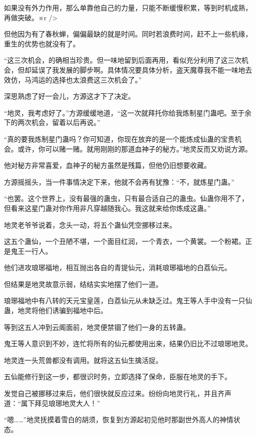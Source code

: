 
\begin{this_body}

如果没有外力作用，那么单靠他自己的力量，只能不断缓慢积累，等到时机成熟，再做突破。※r />

但他因为有了春秋蝉，偏偏最缺的就是时间。同时若浪费时间，赶不上一些机缘，重生的优势也就没有了。

“这三次机会，的确相当珍贵。但一味地留到后面再用，看似充分利用了这三次机会，但却延误了我发展的脚步啊。具体情况要具体分析，盗天魔尊我不能一味地去效仿，马鸿运的选择也太浪费这三次机会了。”

深思熟虑了好一会儿，方源这才下了决定。

“地灵，我考虑好了。”方源缓缓地道，“这一次就拜托你给我炼制星门蛊吧。至于余下的两次机会，留着以后再说。”

“真的要我炼制星门蛊吗？你可知道，你现在放弃的是一个能炼成仙蛊的宝贵机会。或许，你可以赌一赌。就用刚刚的那道血神子的秘方。”地灵反而又劝说方源。

他对秘方非常喜爱，血神子的秘方虽然是残篇，但他仍旧想要收藏。

方源摇摇头，当一件事情决定下来，他就不会再有犹豫：“不，就炼星门蛊。”

“也罢。这个世界上，没有最强的蛊虫，只有最合适自己的蛊虫。仙蛊你用不了，但看来这星门蛊对你作用非凡穿越随我心。我这就来给你炼成这蛊。”

地灵老爷爷说着，念头一动，将五个蛊仙凭空挪移过来。

这五个蛊仙，一个丑陋不堪，一个面目红润，一个青衣，一个黄裳。一个粉裙。正是鬼王一行人。

他们进攻琅琊福地，相互抛出各自的青提仙元，消耗琅琊福地的白荔仙元。

但结果是地灵故意示弱，结结实实地摆了他们一道。

琅琊福地中有八转的天元宝皇莲，白荔仙元从未缺乏过。鬼王等人手中没有一只仙蛊，地灵将他们诱骗到福地中后。

等到这五人冲到云阁面前，地灵便禁锢了他们一身的五转蛊。

鬼王等人意识到不妙，连忙将所有的仙元都使用出来，结果仍旧比不过琅琊地灵。

地灵连一头荒兽都没有调用。就将这五仙生擒活捉。

五仙能修行到这一步，都很识时务，立即选择了保命，臣服在地灵的手下。

发觉自己被挪移过来后，他们很快就反应过来。纷纷向地灵行礼，并且齐声道：“属下拜见琅琊地灵大人！”

“嗯……”地灵抚摸着雪白的胡须，恢复到方源起初见他时那副世外高人的神情状态。


\end{this_body}
